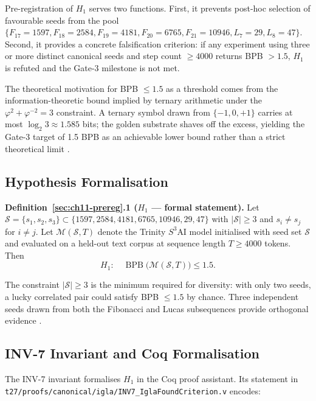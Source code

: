 Pre-registration of \(H_1\) serves two functions.
First, it prevents post-hoc selection of
favourable seeds from the pool
\(\{F_{17}=1597, F_{18}=2584, F_{19}=4181, F_{20}=6765, F_{21}=10946, L_7=29, L_8=47\}\).
Second, it provides a concrete falsification
criterion: if any experiment using three or more
distinct canonical seeds and step count
\(\geq 4000\) returns BPB \(> 1.5\), \(H_1\) is refuted
and the Gate-3 milestone is not met.

The theoretical motivation for BPB \(\leq 1.5\) as
a threshold comes from the information-theoretic
bound implied by ternary arithmetic under the
\(\varphi^2 + \varphi^{-2} = 3\) constraint.
A ternary symbol drawn from \(\{-1, 0, +1\}\)
carries at most \(\log_2 3 \approx 1.585\) bits;
the golden substrate shaves off the excess,
yielding the Gate-3 target of 1.5 BPB as an
achievable lower bound rather than a strict
theoretical limit \cite{shannon_mathematical}.

\subsection{Hypothesis Formalisation}
\label{subsec:ch11-prereg-hyp}

\textbf{Definition~\ref{sec:ch11-prereg}.1 (\(H_1\) --- formal statement).}
Let
\(\mathcal{S} = \{s_1, s_2, s_3\} \subset \{1597, 2584, 4181, 6765, 10946, 29, 47\}\)
with \(|\mathcal{S}| \geq 3\) and \(s_i \neq s_j\)
for \(i \neq j\).
Let \(\mathcal{M}(\mathcal{S}, T)\) denote the Trinity
\(S^3\)AI model initialised with seed set \(\mathcal{S}\) and evaluated
on a held-out text corpus at sequence length \(T \geq 4000\) tokens.
Then
\[
  H_1:\quad \operatorname{BPB}\!\bigl(\mathcal{M}(\mathcal{S}, T)\bigr) \leq 1.5.
\]

The constraint \(|\mathcal{S}| \geq 3\) is the
minimum required for diversity: with only two
seeds, a lucky correlated pair could satisfy BPB
\(\leq 1.5\) by chance.
Three independent seeds drawn from both the Fibonacci and Lucas
subsequences provide orthogonal evidence \cite{shannon_mathematical}.

\subsection{INV-7 Invariant and Coq Formalisation}
\label{subsec:ch11-prereg-inv7}

The INV-7 invariant formalises \(H_1\) in the Coq proof
assistant.
Its statement in
\texttt{t27/proofs/canonical/igla/INV7\_IglaFoundCriterion.v}
encodes:

